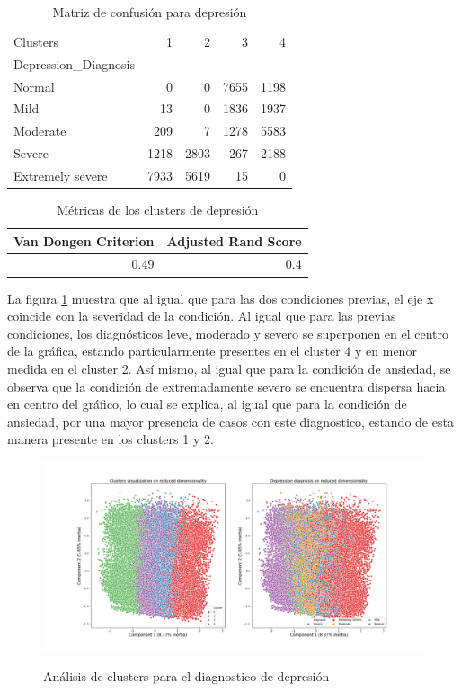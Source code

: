 \begin{table}[ht]
\centering
\caption{Matriz de confusión para depresión}
\begin{tabular}{lrrrr}
\toprule
Clusters &     1 &     2 &     3 &     4 \\
Depression\_Diagnosis &       &       &       &       \\
\midrule
Normal               &  0 &  0 &  7655 &  1198 \\
Mild                 &  13 &  0 &  1836 &  1937 \\
Moderate             &  209 &  7 &  1278 &  5583 \\
Severe               &  1218 &  2803 &  267 &  2188 \\
Extremely severe     &  7933 &  5619 &  15 &  0 \\
\bottomrule
\end{tabular}
\label{matriz_depresion} 
\end{table}%



\begin{table}[ht]
\centering
\caption{Métricas de los clusters de depresión}
\begin{tabular}{rr}
\toprule
 Van Dongen Criterion &  Adjusted Rand Score \\
\midrule
0.49 & 0.4 \\
\bottomrule
\end{tabular}
\label{metricas_matriz_depresion}
\end{table}%




La figura \ref{clusters_depresion} muestra que al igual que para las dos condiciones previas, el eje x coincide con la severidad de la condición. Al igual que para las previas condiciones, los diagnósticos leve, moderado y severo se superponen en el centro de la gráfica, estando particularmente presentes en el cluster 4 y en menor medida en el cluster 2. Así mismo, al igual que para la condición de ansiedad, se observa que la condición de extremadamente severo se encuentra dispersa hacia en centro del gráfico, lo cual se explica, al igual que para la condición de ansiedad, por una mayor presencia de casos con este diagnostico, estando de esta manera presente en los clusters 1 y 2.

\begin{figure}[hbt!]
\caption{Análisis de clusters para el diagnostico de depresión}
\centering
\includegraphics[width=\textwidth,height=\textheight,keepaspectratio]{Media/Pictures/depression_clusters.png} 
\label{clusters_depresion}
\end{figure}







